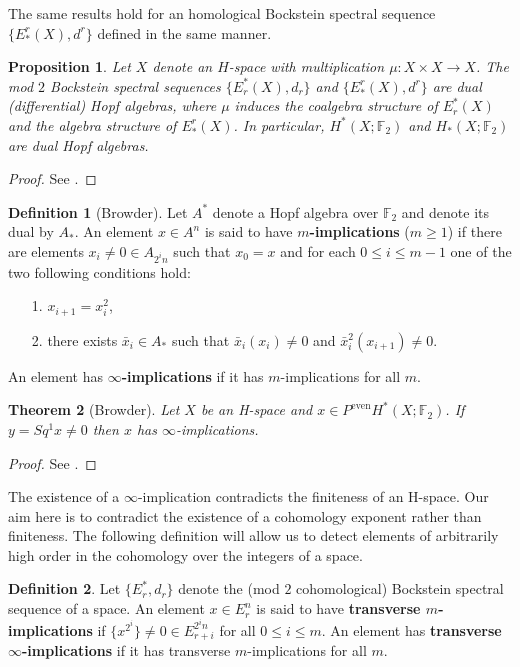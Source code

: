 \documentclass[11pt,a4paper]{amsart}
\theoremstyle{plain}
\newtheorem{thm}{Theorem}[section]
\newtheorem{prop}[thm]{Proposition}
\theoremstyle{definition}
\newtheorem{defn}{Definition}[section]
\theoremstyle{remark}
\newcommand{\F}{\mathbb{F}}
\renewcommand{\geq}{\geqslant}
\renewcommand{\leq}{\leqslant}
\begin{document}
The same results hold for an homological Bockstein spectral sequence $\{E^r_*(X),d^r\}$ defined in the same manner.

\begin{prop}
Let $X$ denote an $H$-space with multiplication $\mu:X\times X\to X$. The mod $2$ Bockstein spectral sequences $\{E_r^*(X),d_r\}$ and $\{E^r_*(X),d^r\}$ are dual (differential) Hopf algebras, where $\mu$ induces the coalgebra structure of $E_r^*(X)$ and the algebra structure of $E^r_*(X)$. In particular, $H^*(X;\F_2)$ and $H_*(X;\F_2)$ are dual Hopf algebras.
\end{prop}

\begin{proof}
See \cite[Proposition 4.7, pp. 36-37]{Br-61}.
\end{proof}

\begin{defn}[Browder]
Let $A^*$ denote a Hopf algebra over $\F_2$ and denote its dual by $A_*$. An element $x\in A^n$ is said to have {\bf $m$-implications} ($m\geq1$) if there are elements $x_i\not=0\in A_{2^i n}$ such that $x_0=x$ and for each $0\leq i\leq m-1$ one of the two following conditions hold: 
\begin{itemize}
\item[1.]{$x_{i+1}=x_i^2$,}
\item[2.]{there exists $\bar{x}_i\in A_*$ such that $\bar{x}_i(x_i)\not =0$ and $\bar{x}_i^2(x_{i+1})\not =0$.}
\end{itemize} 
An element has {\bf $\infty$-implications} if it has $m$-implications for all $m$.
\end{defn}

\begin{thm}[Browder]
Let $X$ be an H-space and $x\in P^\text{even}H^*(X;\F_2)$. If $y=Sq^1x\not=0$ then $x$ has $\infty$-implications.
\end{thm}

\begin{proof}
See \cite[Theorem 6.12, p. 46]{Br-61}.
\end{proof}

The existence of a $\infty$-implication contradicts the finiteness of an H-space. Our aim here is to contradict the existence of a cohomology exponent rather than finiteness. The following definition will allow us to detect elements of arbitrarily high order in the cohomology over the integers of a space.

\begin{defn}
Let $\{E_r^*,d_r\}$ denote the (mod $2$ cohomological) Bockstein spectral sequence of a space. An element $x\in E_r^n$ is said to have {\bf transverse $m$-implications} if $\{x^{2^i}\}\not=0\in E_{r+i}^{2^i n}$ for all $0\leq i\leq m$. An element has {\bf transverse $\infty$-implications} if it has transverse $m$-implications for all $m$.
\end{defn}
\end{document}
